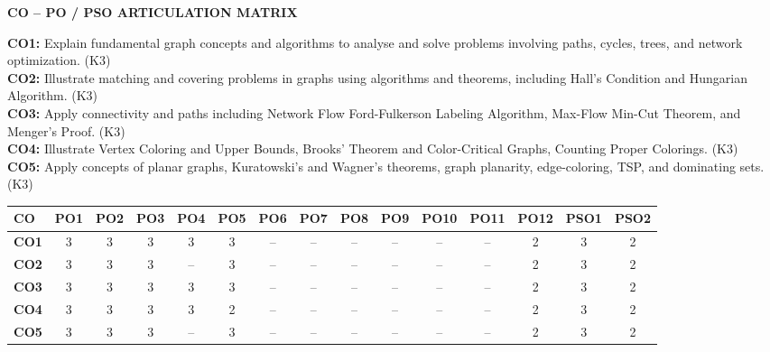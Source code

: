 \documentclass[12pt,a4paper]{report}
\begin{document}
\vspace{0.3cm}
\begin{center}
    {\normalsize\bfseries CO -- PO / PSO ARTICULATION MATRIX\par}
\end{center}
\vspace{-0.15cm}
\noindent\scriptsize
\textbf{CO1:} Explain fundamental graph concepts and algorithms to analyse and solve problems involving paths, cycles, trees, and network optimization. (K3)\\
\textbf{CO2:} Illustrate matching and covering problems in graphs using algorithms and theorems, including Hall's Condition and Hungarian Algorithm. (K3)\\
\textbf{CO3:} Apply connectivity and paths including Network Flow Ford-Fulkerson Labeling Algorithm, Max-Flow Min-Cut Theorem, and Menger's Proof. (K3)\\
\textbf{CO4:} Illustrate Vertex Coloring and Upper Bounds, Brooks' Theorem and Color-Critical Graphs, Counting Proper Colorings. (K3)\\
\textbf{CO5:} Apply concepts of planar graphs, Kuratowski's and Wagner's theorems, graph planarity, edge-coloring, TSP, and dominating sets. (K3)

\vspace{0.15cm}
\noindent
\begin{center}
\scriptsize
\setlength{\tabcolsep}{2.8pt}
\begin{tabular}{|l|c|c|c|c|c|c|c|c|c|c|c|c|c|c|}
\hline
\textbf{CO} & \textbf{PO1} & \textbf{PO2} & \textbf{PO3} & \textbf{PO4} & \textbf{PO5} & \textbf{PO6} & \textbf{PO7} & \textbf{PO8} & \textbf{PO9} & \textbf{PO10} & \textbf{PO11} & \textbf{PO12} & \textbf{PSO1} & \textbf{PSO2} \\ \hline
\textbf{CO1} & 3 & 3 & 3 & 3 & 3 & -- & -- & -- & -- & -- & -- & 2 & 3 & 2 \\ \hline
\textbf{CO2} & 3 & 3 & 3 & -- & 3 & -- & -- & -- & -- & -- & -- & 2 & 3 & 2 \\ \hline
\textbf{CO3} & 3 & 3 & 3 & 3 & 3 & -- & -- & -- & -- & -- & -- & 2 & 3 & 2 \\ \hline
\textbf{CO4} & 3 & 3 & 3 & 3 & 2 & -- & -- & -- & -- & -- & -- & 2 & 3 & 2 \\ \hline
\textbf{CO5} & 3 & 3 & 3 & -- & 3 & -- & -- & -- & -- & -- & -- & 2 & 3 & 2 \\ \hline
\end{tabular}
\end{center}
\end{document}
